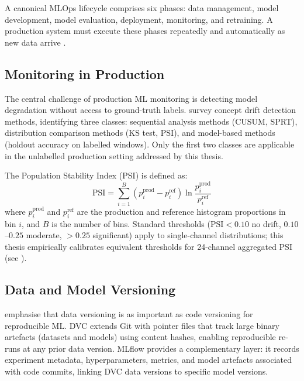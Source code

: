 A canonical MLOps lifecycle comprises six phases: data management, model
development, model evaluation, deployment, monitoring, and retraining.
A production system must execute these phases repeatedly and automatically
as new data arrive \citep{sculley2015hidden}.

\subsection{Monitoring in Production}

The central challenge of production ML monitoring is detecting model
degradation without access to ground-truth labels.
\citet{gama2014survey} survey concept drift detection methods, identifying
three classes: sequential analysis methods (CUSUM, SPRT), distribution
comparison methods (KS test, PSI), and model-based methods (holdout accuracy
on labelled windows).
Only the first two classes are applicable in the unlabelled production setting
addressed by this thesis.

The Population Stability Index (PSI) is defined as:
\begin{equation}
  \text{PSI} = \sum_{i=1}^{B}
    \left( p_i^{\text{prod}} - p_i^{\text{ref}} \right)
    \ln \frac{p_i^{\text{prod}}}{p_i^{\text{ref}}}
  \label{eq:psi}
\end{equation}
where $p_i^{\text{prod}}$ and $p_i^{\text{ref}}$ are the production and
reference histogram proportions in bin $i$, and $B$ is the number of bins.
Standard thresholds ($\text{PSI} < 0.10$ no drift, $0.10$--$0.25$ moderate,
$> 0.25$ significant) apply to single-channel distributions; this thesis
empirically calibrates equivalent thresholds for 24-channel aggregated PSI
(see ).

\subsection{Data and Model Versioning}

\citet{sculley2015hidden} emphasise that data versioning is as important as
code versioning for reproducible ML.
DVC \citep{dvcteam2020} extends Git with pointer files that track large binary
artefacts (datasets and models) using content hashes, enabling reproducible
re-runs at any prior data version.
MLflow \citep{mlflowteam2018} provides a complementary layer: it records
experiment metadata, hyperparameters, metrics, and model artefacts associated
with code commits, linking DVC data versions to specific model versions.

